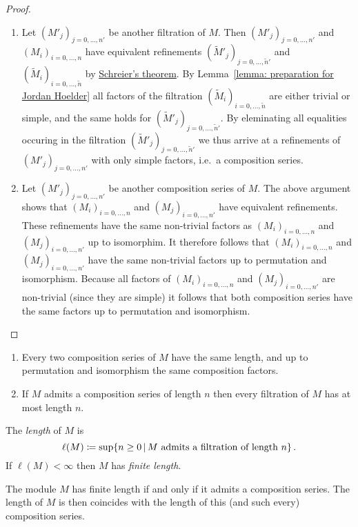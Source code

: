\begin{proof}
  \leavevmode
  \begin{enumerate}
    \item
      Let $(M'_j)_{j = 0, \dotsc, n'}$ be another filtration of $M$.
      Then $(M'_j)_{j = 0, \dotsc, n'}$ and $(M_i)_{i = 0, \dotsc, n}$ have equivalent refinements $(\tilde{M}'_j)_{j = 0, \dotsc, \tilde{n}'}$ and $(\tilde{M}_i)_{i = 0, \dotsc, \tilde{n}}$ by \hyperref[theorem: Schreiers theorem]{Schreier’s theorem}.
      By Lemma~\ref{lemma: preparation for Jordan Hoelder} all factors of the filtration $(\tilde{M}_i)_{i = 0, \dotsc, \tilde{n}}$ are either trivial or simple, and the same holds for $(\tilde{M}'_j)_{j = 0, \dotsc, \tilde{n}'}$.
      By eleminating all equalities occuring in the filtration $(\tilde{M}'_j)_{j = 0, \dotsc, \tilde{n}'}$ we thus arrive at a refinements of $(M'_j)_{j = 0, \dotsc, n'}$ with only simple factors, i.e.\ a composition series.
    \item
      Let $(M'_j)_{j = 0, \dotsc, n'}$ be another composition series of $M$.
      The above argument shows that $(M_i)_{i = 0, \dotsc, n}$ and $(M_j)_{i = 0, \dotsc, n'}$ have equivalent refinements.
      These refinements have the same non-trivial factors as $(M_i)_{i = 0, \dotsc, n}$ and $(M_j)_{i = 0, \dotsc, n'}$ up to isomorphim.
      It therefore follows that $(M_i)_{i = 0, \dotsc, n}$ and $(M_j)_{i = 0, \dotsc, n'}$ have the same non-trivial factors up to permutation and isomorphism.
      Because all factors of  $(M_i)_{i = 0, \dotsc, n}$ and $(M_j)_{i = 0, \dotsc, n'}$ are non-trivial (since they are simple) it follows that both composition series have the same factors up to permutation and isomorphism.
    \qedhere
  \end{enumerate}
\end{proof}


\begin{corollary}
  \leavevmode
  \begin{enumerate}
    \item
      Every two composition series of $M$ have the same length, and up to permutation and isomorphism the same composition factors.
    \item
      If $M$ admits a composition series of length $n$ then every filtration of $M$ has at most length $n$.
  \end{enumerate}
\end{corollary}


\begin{definition}
  The \emph{length} of $M$ is
  \[
              \ell(M)
    \defined  \sup  \{
                n \geq 0
              \suchthat
                \text{$M$ admits a filtration of length $n$}
              \} \,.
  \]
  If $\ell(M) < \infty$ then $M$ has \emph{finite length}.
\end{definition}


\begin{lemma}
  The module $M$ has finite length if and only if it admits a composition series.
  The length of $M$ is then coincides with the length of this (and such every) composition series.
\end{lemma}


